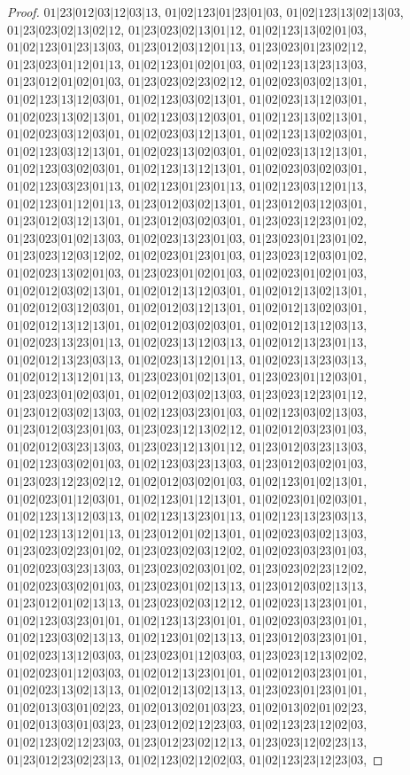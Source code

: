 \documentclass[12pt]{article}
\theoremstyle{plain}
\theoremstyle{definition}
\theoremstyle{remark}
\begin{document}
\begin{proof}
$01|23|012|03|12|03|13$, $01|02|123|01|23|01|03$, $01|02|123|13|02|13|03$, $01|23|023|02|13|02|12$, $01|23|023|02|13|01|12$, $01|02|123|13|02|01|03$, $01|02|123|01|23|13|03$, $01|23|012|03|12|01|13$, $01|23|023|01|23|02|12$, $01|23|023|01|12|01|13$, $01|02|123|01|02|01|03$, $01|02|123|13|23|13|03$, $01|23|012|01|02|01|03$, $01|23|023|02|23|02|12$, $01|02|023|03|02|13|01$, $01|02|123|13|12|03|01$, $01|02|123|03|02|13|01$, $01|02|023|13|12|03|01$, $01|02|023|13|02|13|01$, $01|02|123|03|12|03|01$, $01|02|123|13|02|13|01$, $01|02|023|03|12|03|01$, $01|02|023|03|12|13|01$, $01|02|123|13|02|03|01$, $01|02|123|03|12|13|01$, $01|02|023|13|02|03|01$, $01|02|023|13|12|13|01$, $01|02|123|03|02|03|01$, $01|02|123|13|12|13|01$, $01|02|023|03|02|03|01$, $01|02|123|03|23|01|13$, $01|02|123|01|23|01|13$, $01|02|123|03|12|01|13$, $01|02|123|01|12|01|13$, $01|23|012|03|02|13|01$, $01|23|012|03|12|03|01$, $01|23|012|03|12|13|01$, $01|23|012|03|02|03|01$, $01|23|023|12|23|01|02$, $01|23|023|01|02|13|03$, $01|02|023|13|23|01|03$, $01|23|023|01|23|01|02$, $01|23|023|12|03|12|02$, $01|02|023|01|23|01|03$, $01|23|023|12|03|01|02$, $01|02|023|13|02|01|03$, $01|23|023|01|02|01|03$, $01|02|023|01|02|01|03$, $01|02|012|03|02|13|01$, $01|02|012|13|12|03|01$, $01|02|012|13|02|13|01$, $01|02|012|03|12|03|01$, $01|02|012|03|12|13|01$, $01|02|012|13|02|03|01$, $01|02|012|13|12|13|01$, $01|02|012|03|02|03|01$, $01|02|012|13|12|03|13$, $01|02|023|13|23|01|13$, $01|02|023|13|12|03|13$, $01|02|012|13|23|01|13$, $01|02|012|13|23|03|13$, $01|02|023|13|12|01|13$, $01|02|023|13|23|03|13$, $01|02|012|13|12|01|13$, $01|23|023|01|02|13|01$, $01|23|023|01|12|03|01$, $01|23|023|01|02|03|01$, $01|02|012|03|02|13|03$, $01|23|023|12|23|01|12$, $01|23|012|03|02|13|03$, $01|02|123|03|23|01|03$, $01|02|123|03|02|13|03$, $01|23|012|03|23|01|03$, $01|23|023|12|13|02|12$, $01|02|012|03|23|01|03$, $01|02|012|03|23|13|03$, $01|23|023|12|13|01|12$, $01|23|012|03|23|13|03$, $01|02|123|03|02|01|03$, $01|02|123|03|23|13|03$, $01|23|012|03|02|01|03$, $01|23|023|12|23|02|12$, $01|02|012|03|02|01|03$, $01|02|123|01|02|13|01$, $01|02|023|01|12|03|01$, $01|02|123|01|12|13|01$, $01|02|023|01|02|03|01$, $01|02|123|13|12|03|13$, $01|02|123|13|23|01|13$, $01|02|123|13|23|03|13$, $01|02|123|13|12|01|13$, $01|23|012|01|02|13|01$, $01|02|023|03|02|13|03$, $01|23|023|02|23|01|02$, $01|23|023|02|03|12|02$, $01|02|023|03|23|01|03$, $01|02|023|03|23|13|03$, $01|23|023|02|03|01|02$, $01|23|023|02|23|12|02$, $01|02|023|03|02|01|03$, $01|23|023|01|02|13|13$, $01|23|012|03|02|13|13$, $01|23|012|01|02|13|13$, $01|23|023|02|03|12|12$, $01|02|023|13|23|01|01$, $01|02|123|03|23|01|01$, $01|02|123|13|23|01|01$, $01|02|023|03|23|01|01$, $01|02|123|03|02|13|13$, $01|02|123|01|02|13|13$, $01|23|012|03|23|01|01$, $01|02|023|13|12|03|03$, $01|23|023|01|12|03|03$, $01|23|023|12|13|02|02$, $01|02|023|01|12|03|03$, $01|02|012|13|23|01|01$, $01|02|012|03|23|01|01$, $01|02|023|13|02|13|13$, $01|02|012|13|02|13|13$, $01|23|023|01|23|01|01$, $01|02|013|03|01|02|23$, $01|02|013|02|01|03|23$, $01|02|013|02|01|02|23$, $01|02|013|03|01|03|23$, $01|23|012|02|12|23|03$, $01|02|123|23|12|02|03$, $01|02|123|02|12|23|03$, $01|23|012|23|02|12|13$, $01|23|023|12|02|23|13$, $01|23|012|23|02|23|13$, $01|02|123|02|12|02|03$, $01|02|123|23|12|23|03$, 
\end{proof}
\end{document}
